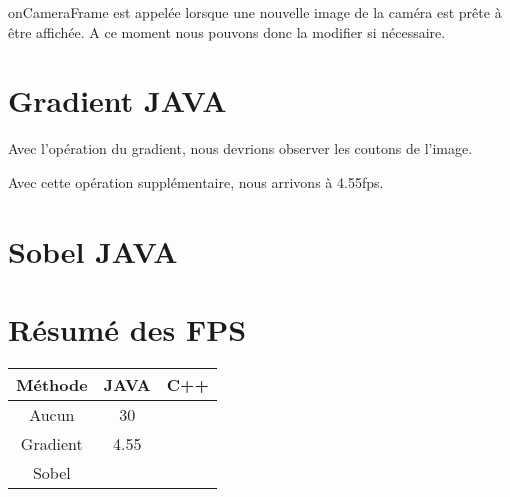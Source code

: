 \documentclass{report}
\begin{document}
				onCameraFrame est appelée lorsque une nouvelle image de la caméra est prête à être affichée.
				A ce moment nous pouvons donc la modifier si nécessaire.
		\section{Gradient JAVA}
			Avec l'opération du gradient, nous devrions observer les coutons de l'image.
			
			Avec cette opération supplémentaire, nous arrivons à 4.55fps.
			
		\section{Sobel JAVA}
			
		\section{Résumé des FPS}
			\begin{tabular}{|c|c|c|}
				\hline
				Méthode & JAVA & C++\\\hline
				Aucun & 30 & \\\hline
				Gradient & 4.55 & \\\hline
				Sobel & & \\\hline
			\end{tabular}
\end{document}
